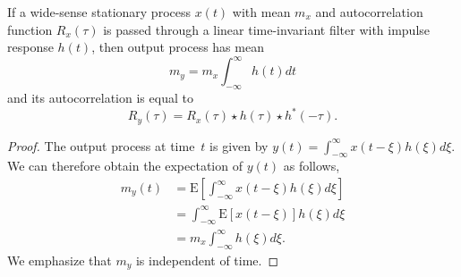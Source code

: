 \begin{theorem}
If a wide-sense stationary process $x(t)$ with mean $m_x$ and autocorrelation function $R_x(\tau)$ is passed through a linear time-invariant filter with impulse response $h(t)$, then output process has mean
\begin{equation*}
m_y = m_x \int_{-\infty}^{\infty} h(t) dt
\end{equation*}
and its autocorrelation is equal to
\begin{equation*}
R_y (\tau) = R_x(\tau) \star h(\tau) \star h^*(-\tau) .
\end{equation*}
\end{theorem}
\begin{proof}
The output process at time~$t$ is given by $y(t) = \int_{-\infty}^{\infty} x(t - \xi) h(\xi) d\xi$.
We can therefore obtain the expectation of $y(t)$ as follows,
\begin{equation*}
\begin{split}
m_y (t) &= \mathrm{E} \left[ \int_{-\infty}^{\infty} x(t - \xi) h(\xi) d\xi \right] \\
&= \int_{-\infty}^{\infty} \mathrm{E} \left[ x(t - \xi) \right] h(\xi) d\xi \\
&= m_x \int_{-\infty}^{\infty} h(\xi) d\xi.
\end{split}
\end{equation*}
We emphasize that $m_y$ is independent of time.


\end{proof}
